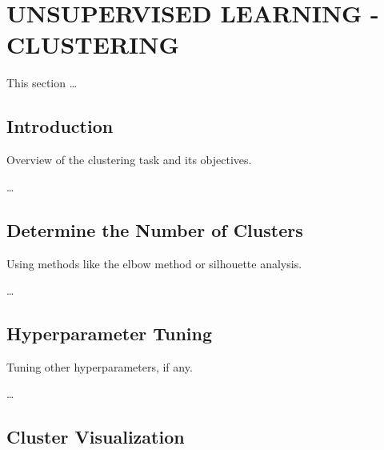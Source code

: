 

\section{UNSUPERVISED LEARNING - CLUSTERING}

    This section \ldots

    \subsection{Introduction}
    
        Overview of the clustering task and its objectives.

        \ldots

    \subsection{Determine the Number of Clusters}
    
        Using methods like the elbow method or silhouette analysis.

        \ldots
        
    \subsection{Hyperparameter Tuning}
    
        Tuning other hyperparameters, if any.

        \ldots
        
    \subsection{Cluster Visualization}
    
